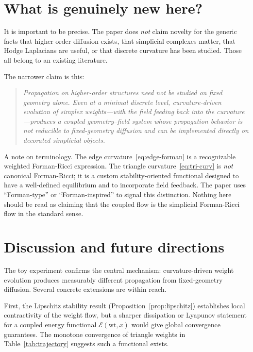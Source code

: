 \documentclass[11pt]{article}
\newcommand{\wt}{\mathrm{wt}}
\newcommand{\Energy}{\mathcal{E}}
\begin{document}
\section{What is genuinely new here?}

It is important to be precise. The paper does \emph{not} claim novelty for the generic facts that higher-order diffusion exists, that simplicial complexes matter, that Hodge Laplacians are useful, or that discrete curvature has been studied. Those all belong to an existing literature.

The narrower claim is this:
\begin{quote}
\emph{Propagation on higher-order structures need not be studied on fixed geometry alone. Even at a minimal discrete level, curvature-driven evolution of simplex weights---with the field feeding back into the curvature---produces a coupled geometry--field system whose propagation behavior is not reducible to fixed-geometry diffusion and can be implemented directly on decorated simplicial objects.}
\end{quote}

A note on terminology.  The edge curvature~\eqref{eq:edge-forman} is a recognizable weighted Forman-Ricci expression.  The triangle curvature~\eqref{eq:tri-curv} is \emph{not} canonical Forman-Ricci; it is a custom stability-oriented functional designed to have a well-defined equilibrium and to incorporate field feedback.  The paper uses ``Forman-type'' or ``Forman-inspired'' to signal this distinction.  Nothing here should be read as claiming that the coupled flow is the simplicial Forman-Ricci flow in the standard sense.

\section{Discussion and future directions}

The toy experiment confirms the central mechanism: curvature-driven weight evolution produces measurably different propagation from fixed-geometry diffusion.  Several concrete extensions are within reach.

First, the Lipschitz stability result (Proposition~\ref{prop:lipschitz}) establishes local contractivity of the weight flow, but a sharper dissipation or Lyapunov statement for a coupled energy functional $\Energy(\wt,x)$ would give global convergence guarantees.  The monotone convergence of triangle weights in Table~\ref{tab:trajectory} suggests such a functional exists.
\end{document}

